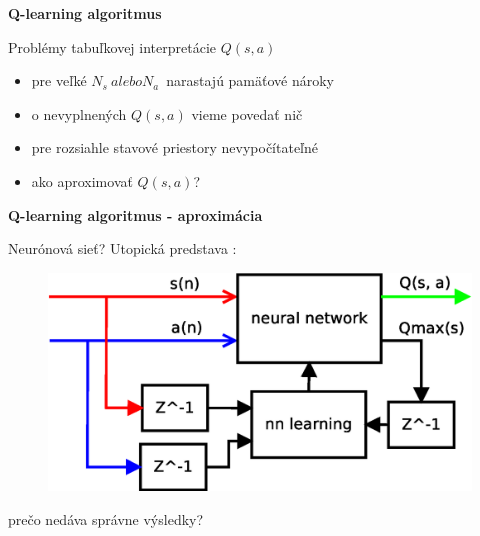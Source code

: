 \documentclass[xcolor=dvipsnames]{beamer}
\begin{document}
\begin{frame}{\bf Q-learning algoritmus}

Problémy tabuľkovej interpretácie $Q(s, a)$

\begin{itemize}
\item pre veľké ${N_s}\  alebo  {N_a}$\ narastajú pamäťové nároky
\item o nevyplnených $Q(s, a)$ vieme povedať nič
\item pre rozsiahle stavové priestory nevypočítateľné
\item ako aproximovať $Q(s, a)$?
\end{itemize}

\end{frame}


\begin{frame}{\bf Q-learning algoritmus - aproximácia}

Neurónová sieť?
Utopická predstava :

\begin{figure}[!htb]
\includegraphics[scale=.5]{../diagrams/q_learning_nn.eps}
\end{figure}

prečo nedáva správne výsledky?
\end{frame}
\end{document}

